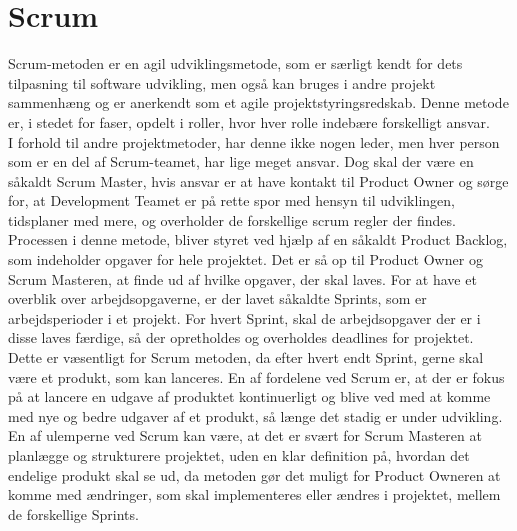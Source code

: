 \section{Scrum}
Scrum-metoden er en agil udviklingsmetode, som er særligt kendt for dets tilpasning til software udvikling, men også kan bruges i andre projekt sammenhæng og er anerkendt som et agile projektstyringsredskab. Denne metode er, i stedet for faser, opdelt i roller, hvor hver rolle indebære forskelligt ansvar.\cite{ScrumRoles} \\
I forhold til andre projektmetoder, har denne ikke nogen leder, men hver person som er en del af Scrum-teamet, har lige meget ansvar. Dog skal der være en såkaldt Scrum Master, hvis ansvar er at have kontakt til Product Owner og sørge for, at Development Teamet er på rette spor med hensyn til udviklingen, tidsplaner med mere, og overholder de forskellige scrum regler der findes. Processen i denne metode, bliver styret ved hjælp af en såkaldt Product Backlog, som indeholder opgaver for hele projektet. Det er så op til Product Owner og Scrum Masteren, at finde ud af hvilke opgaver, der skal laves. For at have et overblik over arbejdsopgaverne, er der lavet såkaldte Sprints, som er arbejdsperioder i et projekt. For hvert Sprint, skal de arbejdsopgaver der er i disse laves færdige, så der opretholdes og overholdes deadlines for projektet. Dette er væsentligt for Scrum metoden, da efter hvert endt Sprint, gerne skal være et produkt, som kan lanceres. En af fordelene ved Scrum er, at der er fokus på at lancere en udgave af produktet kontinuerligt og blive ved med at komme med nye og bedre udgaver af et produkt, så længe det stadig er under udvikling. En af ulemperne ved Scrum kan være, at det er svært for Scrum Masteren at planlægge og strukturere projektet, uden en klar definition på, hvordan det endelige produkt skal se ud, da metoden gør det muligt for Product Owneren at komme med ændringer, som skal implementeres eller ændres i projektet, mellem de forskellige Sprints.\cite{SCRUM}\\
\\
